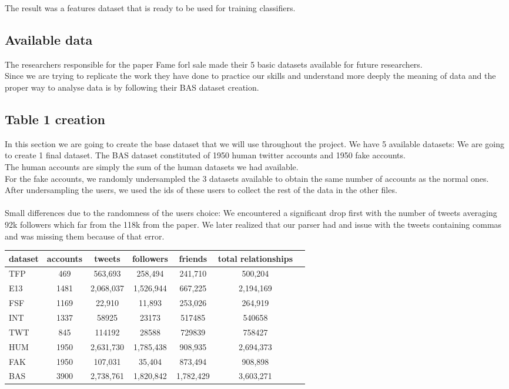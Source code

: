 \documentclass[a4paper,11pt]{article}
\begin{document}
The result was a features dataset that is ready to be used for training classifiers.

\subsection{Available data}
The researchers responsible for the paper Fame forl sale made their 5 basic datasets available for future researchers.\\ 

Since we are trying to replicate the work they have done to practice our skills and understand more deeply the meaning of data and the proper way to analyse data is by following their BAS dataset creation.

\subsection{Table 1 creation}
In this section we are going to create the base dataset that we will use throughout the project.
We have 5 available datasets: 
We are going to create 1 final dataset. The BAS dataset constituted of 1950 human twitter accounts and 1950 fake accounts.\\ The human accounts are simply the sum of the human datasets we had available.\\
For the fake accounts, we randomly undersampled the 3 datasets available to obtain the same number of accounts as the normal ones.\\
After undersampling the users, we used the ids of these users to collect the rest of the data in the other files.\\\\
Small differences due to the randomness of the users choice:
We encountered a significant drop first with the number of tweets averaging 92k followers which far from the 118k from the paper. We later realized that our parser had and issue with the tweets containing commas and was missing them because of that error.\\

\begin{tabular}{lcccccc}
dataset & accounts & tweets & followers & friends & total relationships \\
\hline
TFP & 469 & 563,693 & 258,494 & 241,710 & 500,204 \\
E13 & 1481 & 2,068,037 & 1,526,944 & 667,225 & 2,194,169 \\
FSF & 1169 & 22,910 & 11,893 & 253,026 & 264,919 \\
INT & 1337 & 58925 & 23173 & 517485 & 540658 \\
TWT & 845 & 114192 & 28588 & 729839 & 758427 \\
\hline
HUM & 1950 & 2,631,730 & 1,785,438 & 908,935 & 2,694,373 \\
FAK & 1950 & 107,031 & 35,404 & 873,494 & 908,898 \\
\hline
BAS & 3900 & 2,738,761 & 1,820,842 & 1,782,429 & 3,603,271 \\
\end{tabular}
\end{document}
